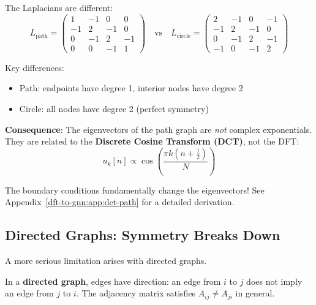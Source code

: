 \begin{notechapter}
\begin{example}
The Laplacians are different:
\[
L_{\text{path}} = \begin{pmatrix}
1 & -1 & 0 & 0 \\
-1 & 2 & -1 & 0 \\
0 & -1 & 2 & -1 \\
0 & 0 & -1 & 1
\end{pmatrix}
\quad \text{vs} \quad
L_{\text{circle}} = \begin{pmatrix}
2 & -1 & 0 & -1 \\
-1 & 2 & -1 & 0 \\
0 & -1 & 2 & -1 \\
-1 & 0 & -1 & 2
\end{pmatrix}
\]

Key differences:
\begin{itemize}
    \item Path: endpoints have degree 1, interior nodes have degree 2
    \item Circle: all nodes have degree 2 (perfect symmetry)
\end{itemize}

\textbf{Consequence}: The eigenvectors of the path graph are 
\emph{not} complex exponentials. They are related to the 
\textbf{Discrete Cosine Transform (DCT)}, not the DFT:
\[
u_k[n] \propto \cos\left(\frac{\pi k (n + \frac{1}{2})}{N}\right)
\]

The boundary conditions fundamentally change the eigenvectors! See 
Appendix~\ref{dft-to-gnn:app:dct-path} for a detailed derivation.
\end{example}

\subsection{Directed Graphs: Symmetry Breaks Down}

A more serious limitation arises with directed graphs.

\begin{definition}
In a \textbf{directed graph}, edges have direction: an edge from $i$ 
to $j$ does not imply an edge from $j$ to $i$. The adjacency matrix 
satisfies $A_{ij} \neq A_{ji}$ in general.
\end{definition}

\begin{figure}[H]
\centering
\begin{tikzpicture}[scale=1.0,
    node/.style={circle, draw, fill=blue!20, minimum size=20pt},
    arrow/.style={->, >=stealth, thick}]
    

\end{tikzpicture}
\end{figure}
\end{notechapter}
